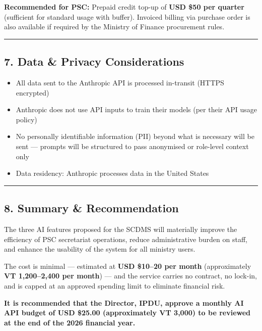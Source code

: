 \documentclass[
]{article}
\providecommand{\tightlist}{%
  \setlength{\itemsep}{0pt}\setlength{\parskip}{0pt}}
\begin{document}
\textbf{Recommended for PSC:} Prepaid credit top-up of \textbf{USD \$50
per quarter} (sufficient for standard usage with buffer). Invoiced
billing via purchase order is also available if required by the Ministry
of Finance procurement rules.

\begin{center}\rule{0.5\linewidth}{0.5pt}\end{center}

\subsection{7. Data \& Privacy
Considerations}\label{data-privacy-considerations}

\begin{itemize}
\tightlist
\item
  All data sent to the Anthropic API is processed in-transit (HTTPS
  encrypted)
\item
  Anthropic does not use API inputs to train their models (per their API
  usage policy)
\item
  No personally identifiable information (PII) beyond what is necessary
  will be sent --- prompts will be structured to pass anonymised or
  role-level context only
\item
  Data residency: Anthropic processes data in the United States
\end{itemize}

\begin{center}\rule{0.5\linewidth}{0.5pt}\end{center}

\subsection{8. Summary \& Recommendation}\label{summary-recommendation}

The three AI features proposed for the SCDMS will materially improve the
efficiency of PSC secretariat operations, reduce administrative burden
on staff, and enhance the usability of the system for all ministry
users.

The cost is minimal --- estimated at \textbf{USD \$10--20 per month}
(approximately \textbf{VT 1,200--2,400 per month}) --- and the service
carries no contract, no lock-in, and is capped at an approved spending
limit to eliminate financial risk.

\textbf{It is recommended that the Director, IPDU, approve a monthly AI
API budget of USD \$25.00 (approximately VT 3,000) to be reviewed at the
end of the 2026 financial year.}
\end{document}
